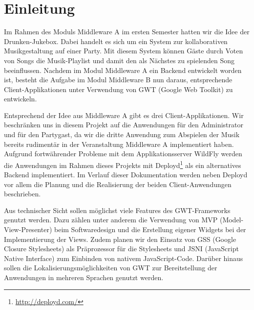 \section{Einleitung}
Im Rahmen des Moduls Middleware A im ersten Semester hatten wir die Idee der Drunken-Jukebox. Dabei handelt es sich um ein System zur kollaborativen Musikgestaltung auf einer Party. Mit diesem System können Gäste durch Voten von Songs die Musik-Playlist und damit den als Nächstes zu spielenden Song beeinflussen. Nachdem im Modul Middleware A ein Backend entwickelt worden ist, besteht die Aufgabe im Modul Middleware B nun daraus, entsprechende Client-Applikationen unter Verwendung von GWT (Google Web Toolkit) zu entwickeln.

Entsprechend der Idee aus Middleware A gibt es drei Client-Applikationen. Wir beschränken uns in diesem Projekt auf die Anwendungen für den Administrator und für den Partygast, da wir die dritte Anwendung zum Abspielen der Musik bereits rudimentär in der Veranstaltung Middleware A implementiert haben. Aufgrund fortwährender Probleme mit dem Applikationsserver WildFly werden die Anwendungen im Rahmen dieses Projekts mit Deployd\footnote{\url{http://deployd.com/}} als ein alternatives Backend implementiert. Im Verlauf dieser Dokumentation werden neben Deployd vor allem die Planung und die Realisierung der beiden Client-Anwendungen beschrieben.

Aus technischer Sicht sollen möglichst viele Features des GWT-Frameworks genutzt werden. Dazu zählen unter anderem die Verwendung von MVP (Model-View-Presenter) beim Softwaredesign und die Erstellung eigener Widgets bei der Implementierung der Views. Zudem planen wir den Einsatz von GSS (Google Closure Stylesheets) als Präprozessor für die Stylesheets und JSNI (JavaScript Native Interface) zum Einbinden von nativem JavaScript-Code. Darüber hinaus sollen die Lokalisierungsmöglichkeiten von GWT zur Bereitstellung der Anwendungen in mehreren Sprachen genutzt werden.